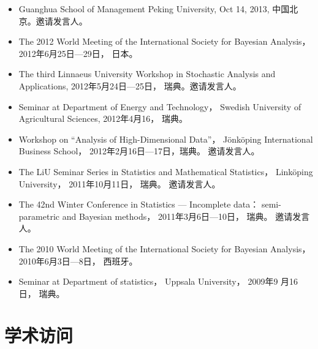 \documentclass[twoside,a4paper,10.5pt]{article}
\begin{document}
\begin{itemize}
\item Guanghua School of Management Peking University, Oct 14, 2013, 中国北京。邀请发言人。

\item The 2012 World Meeting of the International Society for Bayesian
  Analysis， 2012年6月25日---29日， 日本。

\item The third Linnaeus University Workshop in Stochastic Analysis and
  Applications, 2012年5月24日---25日， 瑞典。邀请发言人。

\item Seminar at Department of Energy and Technology， Swedish
  University of Agricultural Sciences, 2012年4月16， 瑞典。

\item Workshop on ``Analysis of High-Dimensional Data''，
  Jönköping International Business School， 2012年2月16日---17日，瑞典。
  邀请发言人。

\item The LiU Seminar Series in Statistics and Mathematical Statistics，
  Linköping University， 2011年10月11日， 瑞典。 邀请发言人。

\item The 42nd Winter Conference in Statistics --- Incomplete data：
  semi-parametric and Bayesian methods， 2011年3月6日---10日，
  瑞典。 邀请发言人。

\item The 2010 World Meeting of the International Society for Bayesian
  Analysis， 2010年6月3日---8日， 西班牙。

\item Seminar at Department of statistics， Uppsala University， 2009年9
  月16日， 瑞典。

\end{itemize}


\section*{学术访问}
\end{document}
